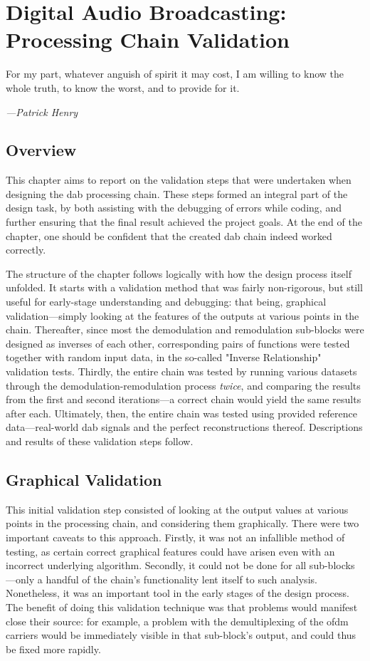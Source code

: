 \documentclass[class=report,11pt,crop=false]{standalone}
\begin{document}
\ifstandalone
\tableofcontents
\fi
\chapter{Digital Audio Broadcasting: Processing Chain Validation \label{ch:dab-validation}}
\epigraph{For my part, whatever anguish of spirit it may cost, I am willing to know the whole truth, to know the worst, and to provide for it.}%
{\emph{---{Patrick Henry}}}

\section{Overview}
This chapter aims to report on the validation steps that were undertaken when designing the \gls{dab} processing chain. These steps formed an integral part of the design task, by both assisting with the debugging of errors while coding, and further ensuring that the final result achieved the project goals. At the end of the chapter, one should be confident that the created \gls{dab} chain indeed worked correctly.

The structure of the chapter follows logically with how the design process itself unfolded. It starts with a validation method that was fairly non-rigorous, but still useful for early-stage understanding and debugging: that being, graphical validation---simply looking at the features of the outputs at various points in the chain. Thereafter, since most the demodulation and remodulation sub-blocks were designed as inverses of each other, corresponding pairs of functions were tested together with random input data, in the so-called "Inverse Relationship" validation tests. Thirdly, the entire chain was tested by running various datasets through the demodulation-remodulation process \emph{twice}, and comparing the results from the first and second iterations---a correct chain would yield the same results after each. Ultimately, then, the entire chain was tested using provided reference data---real-world \gls{dab} signals and the perfect reconstructions thereof. Descriptions and results of these validation steps follow.

\section{Graphical Validation}
This initial validation step consisted of looking at the output values at various points in the processing chain, and considering them graphically. There were two important caveats to this approach. Firstly, it was not an infallible method of testing, as certain correct graphical features could have arisen even with an incorrect underlying algorithm. Secondly, it could not be done for all sub-blocks---only a handful of the chain's functionality lent itself to such analysis. Nonetheless, it was an important tool in the early stages of the design process. The benefit of doing this validation technique was that problems would manifest close their source: for example, a problem with the demultiplexing of the \gls{ofdm} carriers would be immediately visible in that sub-block's output, and could thus be fixed more rapidly.
\end{document}
